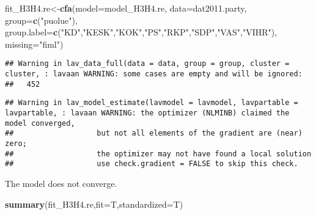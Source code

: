\documentclass[
]{article}
\newenvironment{Shaded}{\begin{snugshade}}{\end{snugshade}}
\newcommand{\DataTypeTok}[1]{\textcolor[rgb]{0.13,0.29,0.53}{#1}}
\newcommand{\KeywordTok}[1]{\textcolor[rgb]{0.13,0.29,0.53}{\textbf{#1}}}
\newcommand{\NormalTok}[1]{#1}
\newcommand{\StringTok}[1]{\textcolor[rgb]{0.31,0.60,0.02}{#1}}
\begin{document}
\begin{Shaded}
\begin{Highlighting}[]
\NormalTok{fit_H3H4.re<-}\KeywordTok{cfa}\NormalTok{(}\DataTypeTok{model=}\NormalTok{model_H3H4.re,}
              \DataTypeTok{data=}\NormalTok{dat2011.party,}
              \DataTypeTok{group=}\KeywordTok{c}\NormalTok{(}\StringTok{"puolue"}\NormalTok{),}
              \DataTypeTok{group.label=}\KeywordTok{c}\NormalTok{(}\StringTok{"KD"}\NormalTok{,}\StringTok{"KESK"}\NormalTok{,}\StringTok{"KOK"}\NormalTok{,}\StringTok{"PS"}\NormalTok{,}\StringTok{"RKP"}\NormalTok{,}\StringTok{"SDP"}\NormalTok{,}\StringTok{"VAS"}\NormalTok{,}\StringTok{"VIHR"}\NormalTok{),}
              \DataTypeTok{missing=}\StringTok{"fiml"}\NormalTok{)}
\end{Highlighting}
\end{Shaded}

\begin{verbatim}
## Warning in lav_data_full(data = data, group = group, cluster = cluster, : lavaan WARNING: some cases are empty and will be ignored:
##   452
\end{verbatim}

\begin{verbatim}
## Warning in lav_model_estimate(lavmodel = lavmodel, lavpartable = lavpartable, : lavaan WARNING: the optimizer (NLMINB) claimed the model converged,
##                   but not all elements of the gradient are (near) zero;
##                   the optimizer may not have found a local solution
##                   use check.gradient = FALSE to skip this check.
\end{verbatim}

The model does not converge.

\begin{Shaded}
\begin{Highlighting}[]
\KeywordTok{summary}\NormalTok{(fit_H3H4.re,}\DataTypeTok{fit=}\NormalTok{T,}\DataTypeTok{standardized=}\NormalTok{T)}
\end{Highlighting}
\end{Shaded}
\end{document}
